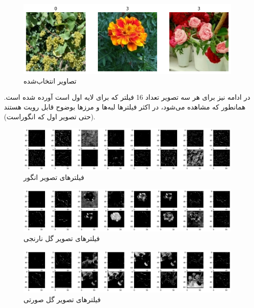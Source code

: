 \documentclass{article}
\begin{document}
\begin{figure}[!h]
    \centering\includegraphics[scale=.45]{./p3-1}
    \caption{تصاویر انتخاب‌شده}\label{fig.31}
\end{figure}

\cleardoublepage

در ادامه نیز برای هر سه تصویر تعداد 16 فیلتر که برای لایه اول است آورده شده است. همانطور که مشاهده می‌شود، در اکثر فیلترها لبه‌ها و مرزها بوضوح قابل رویت هستند (حتی تصویر اول که انگوراست).


\begin{figure}[!h]
    \centering\includegraphics[scale=.40]{./p3-2}
    \caption{فیلترهای تصویر انگور}\label{fig.32}
\end{figure}

\begin{figure}[!h]
    \centering\includegraphics[scale=.40]{./p3-3}
    \caption{فیلترهای تصویر گل نارنجی}\label{fig.33}
\end{figure}

\begin{figure}[!h]
    \centering\includegraphics[scale=.40]{./p3-4}
    \caption{فیلترهای تصویر گل صورتی}\label{fig.34}
\end{figure}
\end{document}
